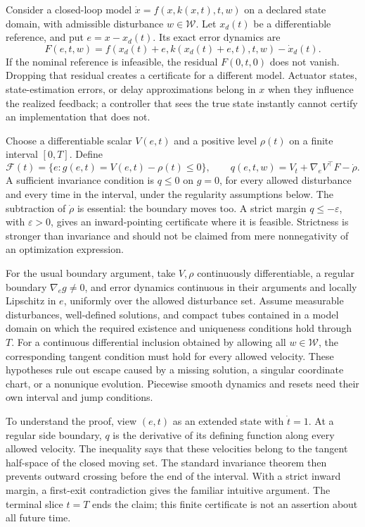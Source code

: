 Consider a closed-loop model $\dot x=f(x,k(x,t),t,w)$ on a declared state domain, with admissible disturbance $w\in\mathcal W$. Let $x_d(t)$ be a differentiable reference, and put $e=x-x_d(t)$. Its exact error dynamics are
\begin{equation}
 F(e,t,w)=f(x_d(t)+e,k(x_d(t)+e,t),t,w)-\dot x_d(t).
 \label{eq:funnel_exact_error}
\end{equation}
If the nominal reference is infeasible, the residual $F(0,t,0)$ does not vanish. Dropping that residual creates a certificate for a different model. Actuator states, state-estimation errors, or delay approximations belong in $x$ when they influence the realized feedback; a controller that sees the true state instantly cannot certify an implementation that does not.

Choose a differentiable scalar $V(e,t)$ and a positive level $\rho(t)$ on a finite interval $[0,T]$. Define
\begin{equation}
 \mathcal F(t)=\{e:g(e,t)=V(e,t)-\rho(t)\leq0\},\qquad
 q(e,t,w)=V_t+\nabla_e V^\top F-\dot\rho.
 \label{eq:funnel_boundary_derivative}
\end{equation}
A sufficient invariance condition is $q\leq0$ on $g=0$, for every allowed disturbance and every time in the interval, under the regularity assumptions below. The subtraction of $\dot\rho$ is essential: the boundary moves too. A strict margin $q\leq-\varepsilon$, with $\varepsilon>0$, gives an inward-pointing certificate where it is feasible. Strictness is stronger than invariance and should not be claimed from mere nonnegativity of an optimization expression.

For the usual boundary argument, take $V,\rho$ continuously differentiable, a regular boundary $\nabla_e g\neq0$, and error dynamics continuous in their arguments and locally Lipschitz in $e$, uniformly over the allowed disturbance set. Assume measurable disturbances, well-defined solutions, and compact tubes contained in a model domain on which the required existence and uniqueness conditions hold through $T$. For a continuous differential inclusion obtained by allowing all $w\in\mathcal W$, the corresponding tangent condition must hold for every allowed velocity. These hypotheses rule out escape caused by a missing solution, a singular coordinate chart, or a nonunique evolution. Piecewise smooth dynamics and resets need their own interval and jump conditions.

To understand the proof, view $(e,t)$ as an extended state with $\dot t=1$. At a regular side boundary, $q$ is the derivative of its defining function along every allowed velocity. The inequality says that these velocities belong to the tangent half-space of the closed moving set. The standard invariance theorem then prevents outward crossing before the end of the interval. With a strict inward margin, a first-exit contradiction gives the familiar intuitive argument. The terminal slice $t=T$ ends the claim; this finite certificate is not an assertion about all future time.

